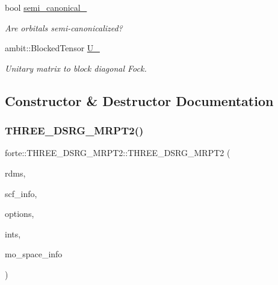 \begin{DoxyCompactItemize}
bool \mbox{\hyperlink{classforte_1_1_t_h_r_e_e___d_s_r_g___m_r_p_t2_a35b63cd49bc893adf30132f13c2ebc20}{semi\+\_\+canonical\+\_\+}}
\begin{DoxyCompactList}\small\item\em Are orbitals semi-\/canonicalized? \end{DoxyCompactList}\item 
ambit\+::\+Blocked\+Tensor \mbox{\hyperlink{classforte_1_1_t_h_r_e_e___d_s_r_g___m_r_p_t2_a83aeac94b48e2d43213733ec96c5ff77}{U\+\_\+}}
\begin{DoxyCompactList}\small\item\em Unitary matrix to block diagonal Fock. \end{DoxyCompactList}\end{DoxyCompactItemize}


\subsection{Constructor \& Destructor Documentation}
\mbox{\label{classforte_1_1_t_h_r_e_e___d_s_r_g___m_r_p_t2_accf4da4a0ee49164a246fed381672096}} 
\subsubsection{\texorpdfstring{T\+H\+R\+E\+E\+\_\+\+D\+S\+R\+G\+\_\+\+M\+R\+P\+T2()}{THREE\_DSRG\_MRPT2()}}
{\footnotesize\ttfamily forte\+::\+T\+H\+R\+E\+E\+\_\+\+D\+S\+R\+G\+\_\+\+M\+R\+P\+T2\+::\+T\+H\+R\+E\+E\+\_\+\+D\+S\+R\+G\+\_\+\+M\+R\+P\+T2 (\begin{DoxyParamCaption}\item[{\mbox{\hyperlink{classforte_1_1_r_d_ms}{R\+D\+Ms}}}]{rdms,  }\item[{std\+::shared\+\_\+ptr$<$ \mbox{\hyperlink{classforte_1_1_s_c_f_info}{S\+C\+F\+Info}} $>$}]{scf\+\_\+info,  }\item[{std\+::shared\+\_\+ptr$<$ \mbox{\hyperlink{classforte_1_1_forte_options}{Forte\+Options}} $>$}]{options,  }\item[{std\+::shared\+\_\+ptr$<$ \mbox{\hyperlink{classforte_1_1_forte_integrals}{Forte\+Integrals}} $>$}]{ints,  }\item[{std\+::shared\+\_\+ptr$<$ \mbox{\hyperlink{classforte_1_1_m_o_space_info}{M\+O\+Space\+Info}} $>$}]{mo\+\_\+space\+\_\+info }\end{DoxyParamCaption})}



